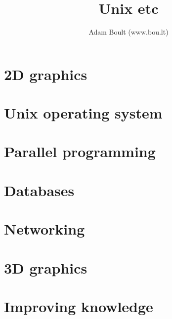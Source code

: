 \documentclass[oneside]{book}
\begin{document}
\author{Adam Boult (www.bou.lt)}
\title{Unix etc}
\maketitle

\setcounter{tocdepth}{0}
\tableofcontents





\part{2D graphics}






\part{Unix operating system}


\part{Parallel programming}


\part{Databases}




\part{Networking}

\part{3D graphics}







\part{Improving knowledge}


\end{document}
